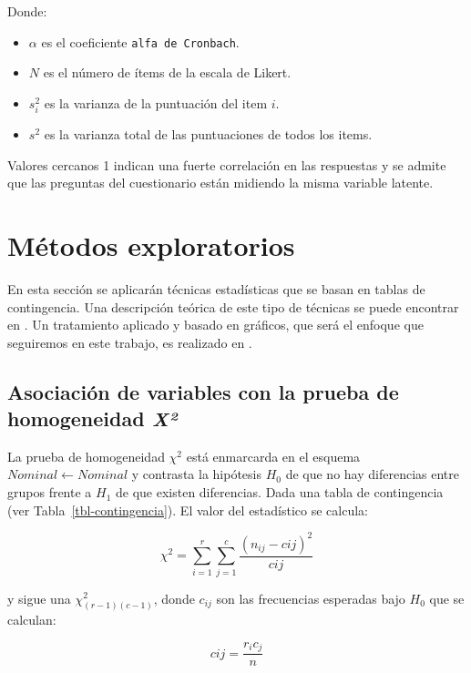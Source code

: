 \documentclass[
  12pt,
  a4paper,
  extrafontsizes,
  onecolumn,
  openright,
  table]{memoir}
\providecommand{\tightlist}{%
  \setlength{\itemsep}{0pt}\setlength{\parskip}{0pt}}\usepackage{longtable,booktabs,array}
\begin{document}
Donde:

\begin{itemize}
\tightlist
\item
  \(\alpha\) es el coeficiente \texttt{alfa\ de\ Cronbach}.
\item
  \(N\) es el número de ítems de la escala de Likert.
\item
  \(s_{i}^{2}\) es la varianza de la puntuación del item \(i\).
\item
  \(s^{2}\) es la varianza total de las puntuaciones de todos los items.
\end{itemize}

Valores cercanos 1 indican una fuerte correlación en las respuestas y se
admite que las preguntas del cuestionario están midiendo la misma
variable latente.

\hypertarget{muxe9todos-exploratorios}{%
\section{Métodos exploratorios}\label{muxe9todos-exploratorios}}

En esta sección se aplicarán técnicas estadísticas que se basan en
tablas de contingencia. Una descripción teórica de este tipo de técnicas
se puede encontrar en \textcite{agresti_2018}. Un tratamiento aplicado y
basado en gráficos, que será el enfoque que seguiremos en este trabajo,
es realizado en \textcite{frienly2015}.

\hypertarget{sec-chi2}{%
\subsection{\texorpdfstring{Asociación de variables con la prueba de
homogeneidad
\emph{X²}}{Asociación de variables con la prueba de homogeneidad X²}}\label{sec-chi2}}

La prueba de homogeneidad \(\chi^2\) \autocite[ver][]{leton2021} está
enmarcarda en el esquema \(Nominal \leftarrow Nominal\) y contrasta la
hipótesis \(H_0\) de que no hay diferencias entre grupos frente a
\(H_1\) de que existen diferencias. Dada una tabla de contingencia (ver
Tabla~\ref{tbl-contingencia}). El valor del estadístico se calcula:

\[
\chi^2 = \sum_{i=1}^r\sum_{j=1}^c\frac{(n_{ij}-c{ij})^2}{c{ij}}
\]

y sigue una \(\chi^2_{(r-1)(c-1)}\), donde \(c_{ij}\) son las
frecuencias esperadas bajo \(H_0\) que se calculan:

\[
c{ij}=\frac{r_ic_j}{n}
\]
\end{document}
